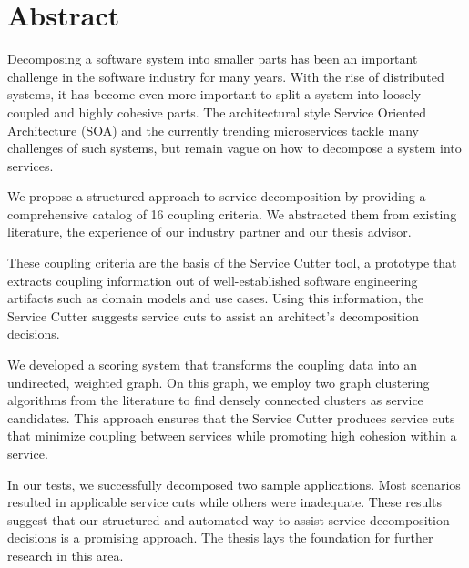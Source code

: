 \chapter{Abstract}

Decomposing a software system into smaller parts has been an important challenge in the software industry for many years. With the rise of distributed systems, it has become even more important to split a system into loosely coupled and highly cohesive parts. The architectural style Service Oriented Architecture (SOA) and the currently trending microservices tackle many challenges of such systems, but remain vague on how to decompose a system into services.

We propose a structured approach to service decomposition by providing a comprehensive catalog of 16 coupling criteria. We abstracted them from existing literature, the experience of our industry partner and our thesis advisor. 

These coupling criteria are the basis of the Service Cutter tool, a prototype that extracts coupling information out of well-established software engineering artifacts such as domain models and use cases. Using this information, the Service Cutter suggests service cuts to assist an architect’s decomposition decisions. 

We developed a scoring system that transforms the coupling data into an undirected, weighted graph. On this graph, we employ two graph clustering algorithms from the literature to find densely connected clusters as service candidates. This approach ensures that the Service Cutter produces service cuts that minimize coupling between services while promoting high cohesion within a service.

In our tests, we successfully decomposed two sample applications. Most scenarios resulted in applicable service cuts while others were inadequate. These results suggest that our structured and automated way to assist service decomposition decisions is a promising approach. The thesis lays the foundation for further research in this area.

